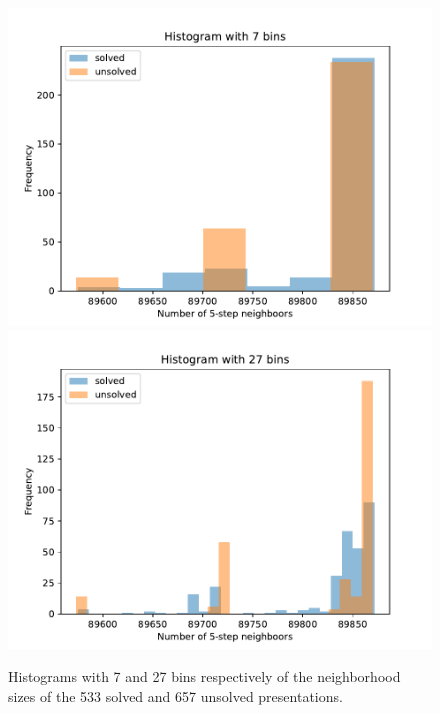\begin{figure}
	\centering
	\includegraphics[scale=.34]{fig/prime_histogram.pdf}
	\includegraphics[scale=.34]{fig/prime_histogram2.pdf}
	\caption{Histograms with 7 and 27 bins respectively of the neighborhood sizes of the 533 solved and 657 unsolved presentations.}
	\label{fig:prime_histogram}
\end{figure}